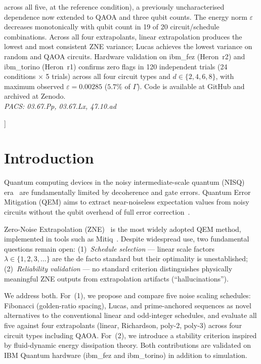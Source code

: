 \documentclass[10pt,letterpaper]{article}
\begin{document}
{\begin{minipage}{0.92\textwidth}
  across all five, at the reference condition),
  a previously uncharacterised dependence now extended to QAOA and
  three qubit counts.
  The energy norm $\varepsilon$ decreases monotonically with qubit count
  in 19 of 20 circuit/schedule combinations.
  Across all four extrapolants, linear extrapolation produces the lowest
  and most consistent ZNE variance; Lucas achieves the lowest variance
  on random and QAOA circuits.
  Hardware validation on ibm\_fez (Heron~r2) and ibm\_torino (Heron~r1)
  confirms zero flags in 120 independent trials (24 conditions
  $\times$ 5 trials) across all four circuit types and
  $d\in\{2,4,6,8\}$, with maximum observed
  $\varepsilon=0.00285$ ($5.7\%$ of $\Gamma$).
  Code is available at GitHub and archived at Zenodo.\\[4pt]
  \textit{PACS: 03.67.Pp, 03.67.Lx, 47.10.ad}
  \end{minipage}
  \vspace{10pt}\par
}]

\section{Introduction}

Quantum computing devices in the noisy intermediate-scale quantum
(NISQ) era~\cite{Preskill2018} are fundamentally limited by decoherence
and gate errors. Quantum Error Mitigation (QEM) aims to extract
near-noiseless expectation values from noisy circuits without the qubit
overhead of full error correction~\cite{Temme2017,Endo2018}.

Zero-Noise Extrapolation (ZNE)~\cite{Temme2017,Li2017} is the most
widely adopted QEM method, implemented in tools such as
Mitiq~\cite{LaRose2022}. Despite widespread use, two fundamental
questions remain open: (1)~\textit{Schedule selection} --- linear scale
factors $\lambda\in\{1,2,3,\ldots\}$ are the de facto standard but their
optimality is unestablished; (2)~\textit{Reliability validation} --- no
standard criterion distinguishes physically meaningful ZNE outputs from
extrapolation artifacts (``hallucinations'').

We address both. For~(1), we propose and compare five noise scaling
schedules: Fibonacci (golden-ratio spacing), Lucas, and prime-anchored
sequences as novel alternatives to the conventional linear and
odd-integer schedules, and evaluate all five against four extrapolants
(linear, Richardson, poly-2, poly-3) across four circuit types including
QAOA. For~(2), we introduce a stability criterion inspired by
fluid-dynamic energy dissipation theory.
Both contributions are validated on IBM Quantum hardware
(ibm\_fez and ibm\_torino) in addition to simulation.
\end{document}
